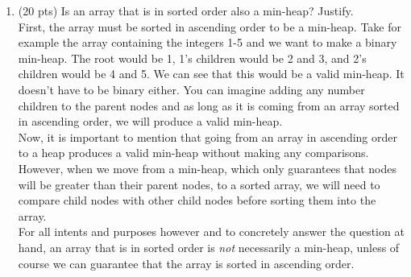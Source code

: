 \documentclass[11pt]{article}
\theoremstyle{definition}
\numberwithin{equation}{section}
\begin{document}
\begin{enumerate}
	\item (20 pts) Is an array that is in sorted order also a min-heap? Justify. \\
	First, the array must be sorted in ascending order to be a min-heap. Take for example the array containing the integers 1-5 and we want to make a binary min-heap. The root would be 1, 1's children would be 2 and 3, and 2's children would be 4 and 5. We can see that this would be a valid min-heap. It doesn't have to be binary either. You can imagine adding any number children to the parent nodes and as long as it is coming from an array sorted in ascending order, we will produce a valid min-heap.\\
	Now, it is important to mention that going from an array in ascending order to a heap produces a valid min-heap without making any comparisons. However, when we move from a min-heap, which only guarantees that nodes will be greater than their parent nodes, to a sorted array, we will need to compare child nodes with other child nodes before sorting them into the array. \\
	For all intents and purposes however and to concretely answer the question at hand, an array that is in sorted order is \emph{not} necessarily a min-heap, unless of course we can guarantee that the array is sorted in ascending order.   
	
	
\end{enumerate}
\end{document}
